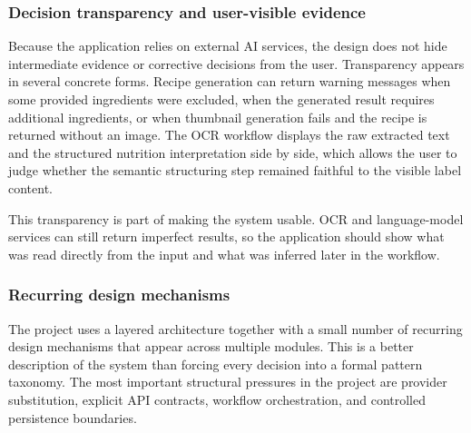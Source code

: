 \subsubsection{Decision transparency and user-visible evidence}

Because the application relies on external AI services, the design does
not hide intermediate evidence or corrective decisions from the user.
Transparency appears in several concrete forms. Recipe generation can
return warning messages when some provided ingredients were excluded,
when the generated result requires additional ingredients, or when
thumbnail generation fails and the recipe is returned without an image.
The OCR workflow displays the raw extracted text and the structured
nutrition interpretation side by side, which allows the user to judge
whether the semantic structuring step remained faithful to the visible
label content.

This transparency is part of making the system usable. OCR and
language-model services can still return imperfect results, so the
application should show what was read directly from the input and what
was inferred later in the workflow.

\subsubsection{Recurring design mechanisms}

The project uses a layered architecture together with a small number of
recurring design mechanisms that appear across multiple modules. This is
a better description of the system than forcing every decision into a
formal pattern taxonomy. The most important structural pressures in the
project are provider substitution, explicit API contracts, workflow
orchestration, and controlled persistence boundaries.

